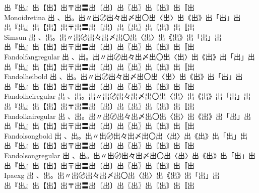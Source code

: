 \begin{tabbing}
\> {\mktsFontfileMonoidregular{}出『出』出【出】出〒出〓出〔出〕出〖出〗出〘出〙出〚出} \\
Monoidretina \> {\mktsFontfileMonoidretina{}出 、出。出〃出〄出々出〆出〇出〈出〉出《出》出「出」出}\\
\> {\mktsFontfileMonoidretina{}出『出』出【出】出〒出〓出〔出〕出〖出〗出〘出〙出〚出} \\
Simsun \> {\mktsFontfileSimsun{}出 、出。出〃出〄出々出〆出〇出〈出〉出《出》出「出」出}\\
\> {\mktsFontfileSimsun{}出『出』出【出】出〒出〓出〔出〕出〖出〗出〘出〙出〚出} \\
Fandolfangregular \> {\mktsFontfileFandolfangregular{}出 、出。出〃出〄出々出〆出〇出〈出〉出《出》出「出」出}\\
\> {\mktsFontfileFandolfangregular{}出『出』出【出】出〒出〓出〔出〕出〖出〗出〘出〙出〚出} \\
Fandolheibold \> {\mktsFontfileFandolheibold{}出 、出。出〃出〄出々出〆出〇出〈出〉出《出》出「出」出}\\
\> {\mktsFontfileFandolheibold{}出『出』出【出】出〒出〓出〔出〕出〖出〗出〘出〙出〚出} \\
Fandolheiregular \> {\mktsFontfileFandolheiregular{}出 、出。出〃出〄出々出〆出〇出〈出〉出《出》出「出」出}\\
\> {\mktsFontfileFandolheiregular{}出『出』出【出】出〒出〓出〔出〕出〖出〗出〘出〙出〚出} \\
Fandolkairegular \> {\mktsFontfileFandolkairegular{}出 、出。出〃出〄出々出〆出〇出〈出〉出《出》出「出」出}\\
\> {\mktsFontfileFandolkairegular{}出『出』出【出】出〒出〓出〔出〕出〖出〗出〘出〙出〚出} \\
Fandolsongbold \> {\mktsFontfileFandolsongbold{}出 、出。出〃出〄出々出〆出〇出〈出〉出《出》出「出」出}\\
\> {\mktsFontfileFandolsongbold{}出『出』出【出】出〒出〓出〔出〕出〖出〗出〘出〙出〚出} \\
Fandolsongregular \> {\mktsFontfileFandolsongregular{}出 、出。出〃出〄出々出〆出〇出〈出〉出《出》出「出」出}\\
\> {\mktsFontfileFandolsongregular{}出『出』出【出】出〒出〓出〔出〕出〖出〗出〘出〙出〚出} \\
Ipaexg \> {\mktsFontfileIpaexg{}出 、出。出〃出〄出々出〆出〇出〈出〉出《出》出「出」出}\\
\> {\mktsFontfileIpaexg{}出『出』出【出】出〒出〓出〔出〕出〖出〗出〘出〙出〚出} \\

\end{tabbing}
